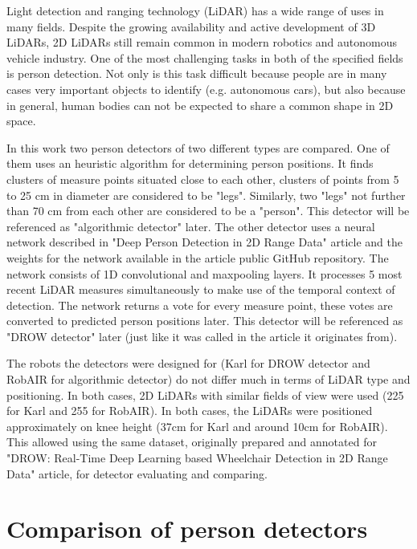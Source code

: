 \documentclass{article}
\begin{document}
Light detection and ranging technology (LiDAR) has a wide range of uses in many fields\cite{lidar_market}.
Despite the growing availability and active development of 3D LiDARs, 2D LiDARs still remain common in modern robotics\cite{lidar_popularity} and autonomous vehicle industry\cite{lidar_autonomous}.
One of the most challenging tasks in both of the specified fields is person detection.
Not only is this task difficult because people are in many cases very important objects to identify (e.g. autonomous cars), but also because in general, human bodies can not be expected to share a common shape in 2D space.

In this work two person detectors of two different types are compared.
One of them uses an heuristic algorithm for determining person positions.
It finds clusters of measure points situated close to each other, clusters of points from 5 to 25 cm in diameter are considered to be "legs".
Similarly, two "legs" not further than 70 cm from each other are considered to be a "person".
This detector will be referenced as "algorithmic detector" later.
The other detector uses a neural network described in "Deep Person Detection in 2D Range Data"\cite{DROW_2018} article and the weights for the network available in the article public GitHub repository\cite{DROW_repo}.
The network consists of 1D convolutional and maxpooling layers.
It processes 5 most recent LiDAR measures simultaneously to make use of the temporal context of detection.
The network returns a vote for every measure point, these votes are converted to predicted person positions later.
This detector will be referenced as "DROW detector" later (just like it was called in the article it originates from).

The robots the detectors were designed for (Karl for DROW detector and RobAIR\cite{RobAIR_site} for algorithmic detector) do not differ much in terms of LiDAR type and positioning.
In both cases, 2D LiDARs with similar fields of view were used (225\textdegree{} for Karl and 255\textdegree{} for RobAIR).
In both cases, the LiDARs were positioned approximately on knee height (37cm for Karl and around 10cm for RobAIR).
This allowed using the same dataset, originally prepared and annotated for "DROW: Real-Time Deep Learning based Wheelchair Detection in 2D
Range Data"\cite{DROW_2016} article, for detector evaluating and comparing.

\section{Comparison of person detectors}
\end{document}
